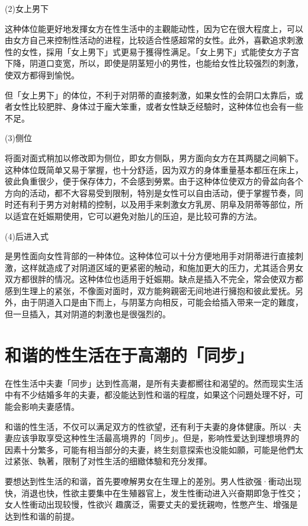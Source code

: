 \documentclass[12pt,UTF8]{ctexbook}
\begin{document}
(2)女上男下

这种体位能更好地发揮女方在性生活中的主觀能动性，因为它在很大程度上，可以由女方自己来控制性活动的进程，比较适合性感超常的女性。此外，喜歡追求刺激性的女性，採用「女上男下」式更易于獲得性满足。「女上男下」式能使女方子宫下降，阴道口变宽，所以，即使是阴茎短小的男性，也能给女性比较强烈的刺激，使双方都得到愉悦。

但「女上男下」的体位，不利于对阴蒂的直接刺激，如果女性的会阴口太靠后，或者女性比较肥胖、身体过于龐大笨重，或者女性缺乏经驗时，这种体位也会有一些不足。

(3)侧位

将面对面式稍加以修改即为侧位，即女方侧臥，男方面向女方在其两腿之间躺下。这种体位既简单又易于掌握，也十分舒适，因为双方的身体重量基本都压在床上，彼此負重很少，便于保存体力，不会感到勞累。由于这种体位使双方的骨盆向各个方向的活动，都不大容易受到限制，特別是女性可以自由活动，便于掌握节奏，同时还有利于男方对射精的控制，以及用手来刺激女方乳房、阴阜及阴蒂等部位，所以适宜在妊娠期使用，它可以避免对胎儿的压迫，是比较可靠的方法。

(4)后进入式

是男性面向女性背部的一种体位。这种体位可以十分方便地用手对阴蒂进行直接刺激，这样就造成了对阴道区域的更紧密的触动，和施加更大的压力，尤其适合男女双方都很胖的情况。这种体位也适用于妊娠期。缺点是插入不完全，常会使双方都感到生理上的紧张，不像面对面时，双方能夠親密无间地进行擁抱和彼此爱抚。另外，由于阴道入口是由下而上，与阴茎方向相反，可能会给插入带来一定的難度，但一旦插入，其对阴道的刺激也是很强烈的。

\section{和谐的性生活在于高潮的「同步」}

在性生活中夫妻「同步」达到性高潮，是所有夫妻都嚮往和渴望的。然而现实生活中有不少结婚多年的夫妻，都没能达到性和谐的程度，如果这个问題处理不好，可能会影响夫妻感情。

和谐的性生活，不仅可以满足双方的性欲望，还有利于夫妻的身体健康。所以·夫妻应该爭取享受这种性生活最高境界的「同步」。但是，影响性爱达到理想境界的因素十分繁多，可能有相当部分的夫妻，終生刻意探索也没能如願，可能是他們太过紧张、執著，限制了对性生活的细緻体驗和充分发揮。

要想达到性生活的和谐，首先要嘹解男女在生理上的差別。男人性欲强·衝动出现快，消退也快，性欲主要集中在生殖器官上，发生性衝动进入兴奋期即急于性交；女人性衝动出现较慢，性欲兴
趣廣泛，需要丈夫的爱抚親吻，性憋产生、增强是达到性和谐的前提。
\end{document}
